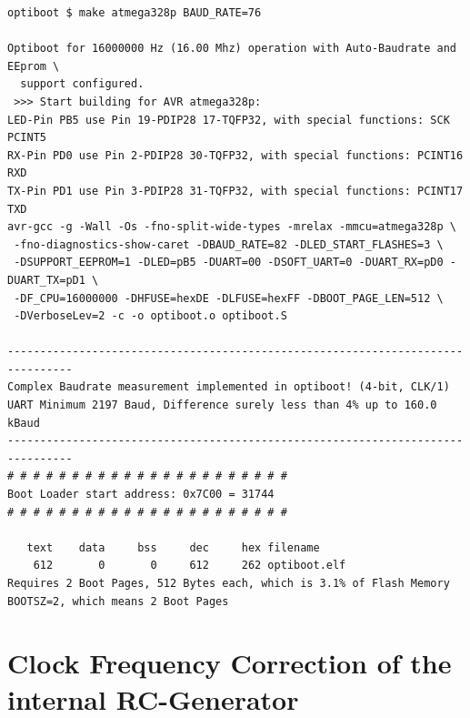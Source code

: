 \begin{verbatim}
optiboot $ make atmega328p BAUD_RATE=76

Optiboot for 16000000 Hz (16.00 Mhz) operation with Auto-Baudrate and EEprom \
  support configured.
 >>> Start building for AVR atmega328p:
LED-Pin PB5 use Pin 19-PDIP28 17-TQFP32, with special functions: SCK PCINT5
RX-Pin PD0 use Pin 2-PDIP28 30-TQFP32, with special functions: PCINT16 RXD
TX-Pin PD1 use Pin 3-PDIP28 31-TQFP32, with special functions: PCINT17 TXD
avr-gcc -g -Wall -Os -fno-split-wide-types -mrelax -mmcu=atmega328p \
 -fno-diagnostics-show-caret -DBAUD_RATE=82 -DLED_START_FLASHES=3 \
 -DSUPPORT_EEPROM=1 -DLED=pB5 -DUART=00 -DSOFT_UART=0 -DUART_RX=pD0 -DUART_TX=pD1 \
 -DF_CPU=16000000 -DHFUSE=hexDE -DLFUSE=hexFF -DBOOT_PAGE_LEN=512 \
 -DVerboseLev=2 -c -o optiboot.o optiboot.S

--------------------------------------------------------------------------------
Complex Baudrate measurement implemented in optiboot! (4-bit, CLK/1)
UART Minimum 2197 Baud, Difference surely less than 4% up to 160.0 kBaud
--------------------------------------------------------------------------------
# # # # # # # # # # # # # # # # # # # # # #
Boot Loader start address: 0x7C00 = 31744
# # # # # # # # # # # # # # # # # # # # # #

   text    data     bss     dec     hex filename
    612       0       0     612     262 optiboot.elf
Requires 2 Boot Pages, 512 Bytes each, which is 3.1% of Flash Memory
BOOTSZ=2, which means 2 Boot Pages

\end{verbatim}


\section{Clock Frequency Correction of the internal RC-Generator}

